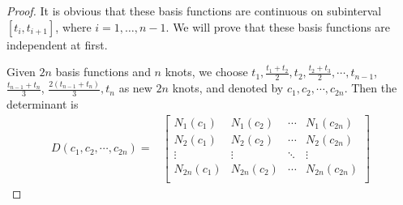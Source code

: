 \begin{proof}
It is obvious that these basis functions are continuous on subinterval $[t_i,t_{i+1}]$, where $i=1,\ldots,n-1$. We will prove that these basis functions are independent at first. 

Given $2n$ basis functions and $n$ knots, we choose $t_1, \frac{t_1+t_2}{2}, t_2, \frac{t_2+t_3}{2}, \cdots, t_{n-1}$, $\frac{t_{n-1}+t_n}{3}$, $\frac{2(t_{n-1}+t_n)}{3}, t_n$ as new $2n$ knots, and denoted by $c_1,c_2,\cdots,c_{2n}$. Then the determinant is
\begin{align}\label{matrixD}
D(c_1,c_2,\cdots,c_{2n})=&
\begin{bmatrix}
N_1(c_1) & N_1(c_2) & \cdots& N_1(c_{2n})\\
N_2(c_1) & N_2(c_2)& \cdots & N_2(c_{2n})\\
 \vdots  &  \vdots  & \ddots  & \vdots  \\  
N_{2n}(c_1) & N_{2n}(c_2) & \cdots & N_{2n}(c_{2n})\\
\end{bmatrix}
\end{align}

\end{proof}
